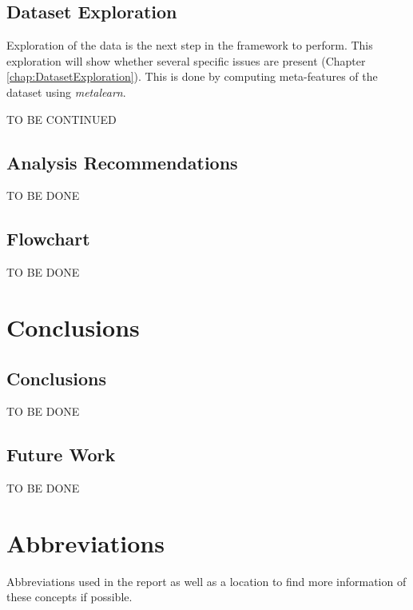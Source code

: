 \documentclass[10pt,a4paper]{report}
\begin{document}
	\section{Dataset Exploration}
	\label{FIsec:ExplorationResults}
	
	Exploration of the data is the next step in the framework to perform. This exploration will show whether several specific issues are present (Chapter \ref{chap:DatasetExploration}). This is done by computing meta-features of the dataset using \textit{metalearn}.
	
	TO BE CONTINUED
	
	\section{Analysis Recommendations}
	\label{FIsec:Analysis Recommendations}
	
	TO BE DONE
	
	\section{Flowchart}
	\label{FIsec:Flowchart}
	
	TO BE DONE
	
	\chapter{Conclusions}
	\label{chap:Conclusions}
	
	\section{Conclusions}
	\label{CCsec:Conclusions}
	
	TO BE DONE
	
	\section{Future Work}
	\label{CCsec:Discussions}
	
	TO BE DONE
	
	 
	
	
	\appendix
	
	\chapter{Abbreviations}
	\label{PLsec:Abbreviations}
	
	Abbreviations used in the report as well as a location to find more information of these concepts if possible.
	
\end{document}
